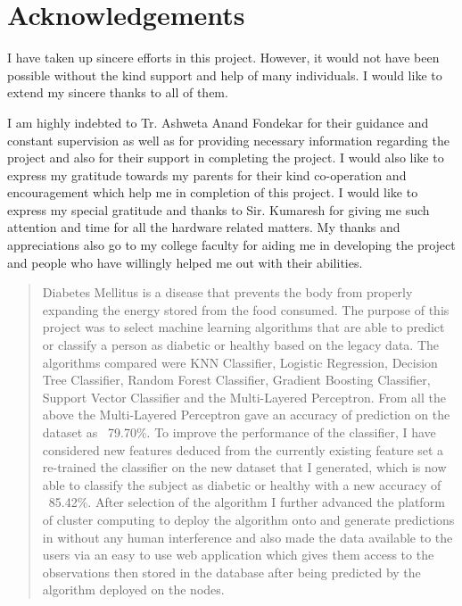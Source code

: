 \documentclass[12pt]{article}
\begin{document}
\clearpage
\newpage
\section{Acknowledgements}
I have taken up sincere efforts in this project. However, it would not have been possible without the kind support and help of many individuals. I would like to extend my sincere thanks to all of them.

I am highly indebted to Tr. Ashweta Anand Fondekar for their guidance and constant supervision as well as for providing necessary information regarding the project and also for their support in completing the project. I would also like to express my gratitude towards my parents for their kind co-operation and encouragement which help me in completion of this project. I would like to express my special gratitude and thanks to Sir. Kumaresh for giving me such attention and time for all the hardware related matters. My thanks and appreciations also go to my college faculty for aiding me in developing the project and people who have willingly helped me out with their abilities.


\newpage
\tableofcontents
\newpage
\listoffigures
\newpage
\listoftables
\newpage


\begin{abstract}
Diabetes Mellitus is a disease that prevents the body from properly expanding the
energy stored from the food consumed. The purpose of this project was to select
machine learning algorithms that are able to predict or classify a person as diabetic
or healthy based on the legacy data. The algorithms compared were KNN
Classifier, Logistic Regression, Decision Tree Classifier, Random Forest
Classifier, Gradient Boosting Classifier, Support Vector Classifier and the
Multi-Layered Perceptron. From all the above the Multi-Layered Perceptron gave
an accuracy of prediction on the dataset as ~79.70\%. To improve the performance
of the classifier, I have considered new features deduced from the currently
existing feature set a re-trained the classifier on the new dataset that I generated,
which is now able to classify the subject as diabetic or healthy with a new accuracy
of ~85.42\%. After selection of the algorithm I further advanced the platform of cluster computing to
deploy the algorithm onto and generate predictions in without any human
interference​ and also made the data available
to the users via an easy to use web application which gives them access to the
observations then stored in the database after being predicted by the algorithm
deployed on the nodes.
\end{abstract}
\end{document}
